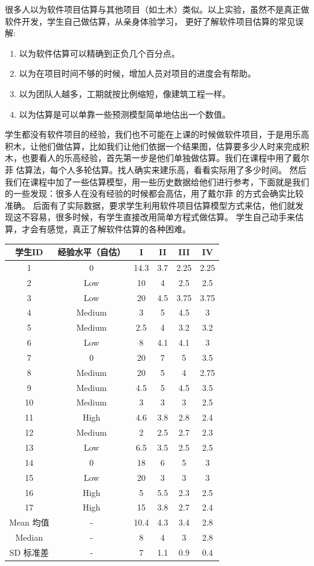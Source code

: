 很多人以为软件项目估算与其他项目（如土木）类似。以上实验，虽然不是真正做软件开发，学生自己做估算，从亲身体验学习，
更好了解软件项目估算的常见误解:

\begin{enumerate}
\tightlist
\item
  以为软件估算可以精确到正负几个百分点。
\item
  以为在项目时间不够的时候，增加人员对项目的进度会有帮助。
\item
  以为团队人越多，工期就按比例缩短，像建筑工程一样。
\item
  以为估算是可以单靠一些预测模型简单地估出一个数值。
\end{enumerate}

学生都没有软件项目的经验，我们也不可能在上课的时候做软件项目，于是用乐高积木，让他们做估算，比如我们让他们依据一个结果图，估算要多少人时来完成积木，也要看人的乐高经验，首先第一步是他们单独做估算。我们在课程中用了戴尔菲
估算法，每个人多轮估算。找人确实来建乐高，看看实际用了多少时间。
然后我们在课程中加了一些估算模型，用一些历史数据给他们进行参考，下面就是我们的一些发现：很多人在没有经验的时候都会高估，用了戴尔菲
的方式会确实比较准确。
后面有了实际数据，要求学生利用软件项目估算模型方式来估，他们就发现这不容易，很多时候，有学生直接改用简单方程式做估算。
学生自己动手来估算，才会有感觉，真正了解软件估算的各种困难。



\begin{tabular}{|c|c|c|c|c|c|}
\hline
学生ID&经验水平（自估）&I&II&III&IV\\
\hline
1&0&14.3&3.7&2.25&2.25\\
\hline
2&Low&10&4&2.5&2.5 \\
\hline
3&Low&20&4.5&3.75&3.75 \\
\hline
4&Medium&3&5&4.5&3\\
\hline
5&Medium&2.5&4&3.2&3.2\\
\hline
6&Low&8&4.1&4.1&3\\
\hline
7&0&20&7&5&3.5\\
\hline
8&Medium&20&5&4&2.75\\
\hline
9&Medium&4.5&5&4.5&3.5\\
\hline
10&Medium&3&3&3&2.5\\
\hline
11&High&4.6&3.8&2.8&2.4\\
\hline
12&Medium&2&2.5&2.7&2.3\\
\hline
13&Low&6.5&3.5&2.5&2.5\\
\hline
14&0&18&6&5&3\\
\hline
15&Low&20&3&3&3\\
\hline
16&High&5&5.5&2.3&2.5\\
\hline
17&High&15&3.8&2.7&2.4\\
\hline
Mean 均值&-&10.4&4.3&3.4&2.8\\
\hline
Median&-&8&4&3&2.8\\
\hline
SD 标准差&-&7&1.1&0.9&0.4\\
\hline
\end{tabular}

